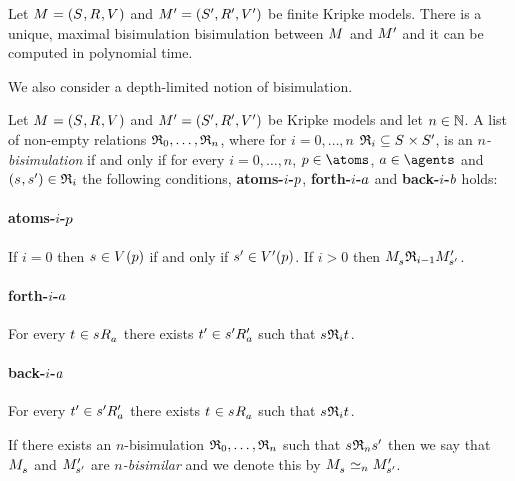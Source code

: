 \begin{proposition}
Let $\kModelAndTuple$ and $\kModelAndTupleP$ be finite Kripke models.
There is a unique, maximal bisimulation bisimulation between $\kModel$ and ${M^{\prime}_{}}$ and it can be computed in polynomial time.
\end{proposition}

We also consider a depth-limited notion of bisimulation.

\begin{definition}[$n$-bisimulation]
Let $\kModelAndTuple$ and $\kModelAndTupleP$ be Kripke models and let $n \in \mathbb{N}$.
A list of non-empty relations $\mathfrak{R}_0, \dots, \mathfrak{R}_n$, where for $i = 0, \dots, n$ $\bisimulation_i \subseteq \kStates \times \kStatesP$, is an {\em $n$-bisimulation} if and only if for every $i = 0, \dots, n$, $\atomP \in \atoms$, $\agentA \in \agents$ and $(\kStateS, \kStateSP) \in \bisimulation_i$ the following conditions, {\bf atoms-$i$-$p$}, {\bf forth-$i$-$a$} and {\bf back-$i$-$b$} holds:

\paragraph{atoms-$i$-$p$}
If $i = 0$ then $\kStateS \in \kValuation(\atomP)$ if and only if ${{s}^{\prime}} \in {V^{\prime}}(p)$.
If $i > 0$ then $\kPModel{\kStateS} \bisimulation_{i-1} \kPModelP{\kStateSP}$.

\paragraph{forth-$i$-$a$}
For every $\kStateT \in \kSuccessorsA{\kStateS}$ there exists ${{t}^{\prime}} \in {{{s}^{\prime}}} {R^{\prime}_{a}}$ such that $\kStateS \bisimulation_i \kStateT$.

\paragraph{back-$i$-$a$}
For every ${{t}^{\prime}} \in {{{s}^{\prime}}} {R^{\prime}_{a}}$ there exists $\kStateT \in \kSuccessorsA{\kStateS}$ such that $\kStateS \bisimulation_i \kStateT$.

If there exists an $n$-bisimulation $\mathfrak{R}_0, \dots, \mathfrak{R}_n$ such that $\kStateS \bisimulation_n \kStateSP$ then we say that $\kPModel{\kStateS}$ and ${M^{\prime}_{{{s}^{\prime}}}}$ are {\em $n$-bisimilar} and we denote this by $\kPModel{\kStateS} \bisimilar[n] \kPModelP{\kStateSP}$.
\end{definition}

